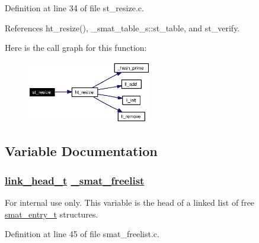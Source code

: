 Definition at line 34 of file st\_\-resize.c.

References ht\_\-resize(), \_\-smat\_\-table\_\-s::st\_\-table, and st\_\-verify.

Here is the call graph for this function:\begin{figure}[H]
\begin{center}
\leavevmode
\includegraphics[width=154pt]{group__dbprim__smat_ga18_cgraph}
\end{center}
\end{figure}


\subsection{Variable Documentation}
\hypertarget{group__dbprim__smat_ga7}{
\subsubsection[\_\-smat\_\-freelist]{\setlength{\rightskip}{0pt plus 5cm}\hyperlink{struct__link__head__s}{link\_\-head\_\-t} \hyperlink{group__dbprim__smat_ga7}{\_\-smat\_\-freelist}}}
\label{group__dbprim__smat_ga7}


\begin{Desc}
\item[For internal use only.]
This variable is the head of a linked list of free \hyperlink{group__dbprim__smat_ga2}{smat\_\-entry\_\-t} structures.\end{Desc}


Definition at line 45 of file smat\_\-freelist.c.